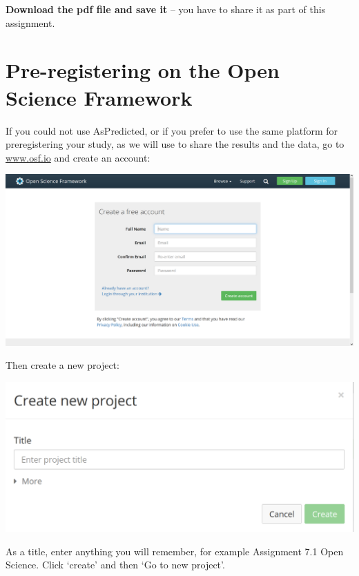 \documentclass[
  oneside]{krantz}
\begin{document}
\textbf{Download the pdf file and save it} -- you have to share it as part of this
assignment.

\hypertarget{pre-registering-on-the-open-science-framework}{%
\section{Pre-registering on the Open Science Framework}\label{pre-registering-on-the-open-science-framework}}

If you could not use AsPredicted, or if you prefer to use the same platform for preregistering your study, as we will use to share the results and the data, go to \href{http://www.osf.io}{www.osf.io} and create an account:

\begin{center}\includegraphics[width=1\linewidth]{images/7d6b26f83fee88df8bd46f30f4441844} \end{center}

Then create a new project:

\begin{center}\includegraphics[width=1\linewidth]{images/2319f53e025e2b9c707f1062f478dc1a} \end{center}

As a title, enter anything you will remember, for example Assignment 7.1 Open
Science. Click `create' and then `Go to new project'.
\end{document}
